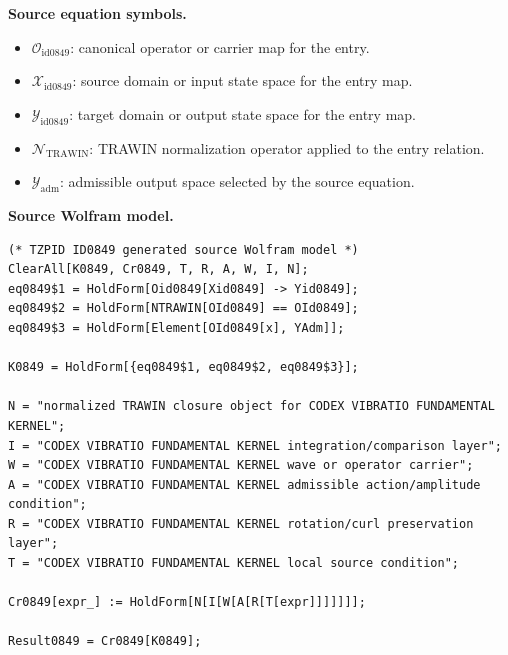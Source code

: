 \begin{minipage}[t]{0.49\linewidth}
\begingroup
\small
\raggedright
\textbf{Source equation symbols.}\par
\begin{itemize}[leftmargin=1.35em,itemsep=1pt,topsep=1pt,parsep=0pt]
    \item $\mathcal{O}_{\mathrm{id0849}}$: canonical operator or carrier map for the entry.
    \item $\mathcal{X}_{\mathrm{id0849}}$: source domain or input state space for the entry map.
    \item $\mathcal{Y}_{\mathrm{id0849}}$: target domain or output state space for the entry map.
    \item $\mathcal{N}_{\mathrm{TRAWIN}}$: TRAWIN normalization operator applied to the entry relation.
    \item $\mathcal{Y}_{\mathrm{adm}}$: admissible output space selected by the source equation.
\end{itemize}
\endgroup
\end{minipage}\hfill
\begin{minipage}[t]{0.47\linewidth}
\begingroup
\scriptsize
\raggedright
\textbf{Source Wolfram model.}\par
\begin{Verbatim}[fontsize=\tiny,breaklines=true,breakanywhere=true]
(* TZPID ID0849 generated source Wolfram model *)
ClearAll[K0849, Cr0849, T, R, A, W, I, N];
eq0849$1 = HoldForm[Oid0849[Xid0849] -> Yid0849];
eq0849$2 = HoldForm[NTRAWIN[OId0849] == OId0849];
eq0849$3 = HoldForm[Element[OId0849[x], YAdm]];

K0849 = HoldForm[{eq0849$1, eq0849$2, eq0849$3}];

N = "normalized TRAWIN closure object for CODEX VIBRATIO FUNDAMENTAL KERNEL";
I = "CODEX VIBRATIO FUNDAMENTAL KERNEL integration/comparison layer";
W = "CODEX VIBRATIO FUNDAMENTAL KERNEL wave or operator carrier";
A = "CODEX VIBRATIO FUNDAMENTAL KERNEL admissible action/amplitude condition";
R = "CODEX VIBRATIO FUNDAMENTAL KERNEL rotation/curl preservation layer";
T = "CODEX VIBRATIO FUNDAMENTAL KERNEL local source condition";

Cr0849[expr_] := HoldForm[N[I[W[A[R[T[expr]]]]]]];

Result0849 = Cr0849[K0849];
\end{Verbatim}
\endgroup
\end{minipage}

